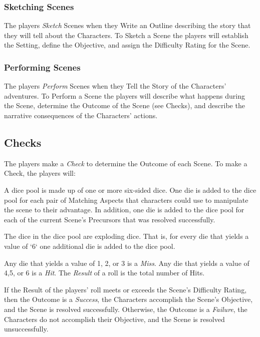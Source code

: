 \documentclass[12pt, a5paper, parskip=half-]{scrartcl}
\begin{document}
\newpage

\subsubsection*{Sketching Scenes}
The players \emph{Sketch} Scenes when they Write an Outline describing the story that they will tell about the Characters. To Sketch a Scene the players will establish the Setting, define the Objective, and assign the Difficulty Rating for the Scene.

\subsubsection*{Performing Scenes}
The players \emph{Perform} Scenes when they Tell the Story of the Characters' adventures.
To Perform a Scene the players will describe what happens during the Scene, determine the Outcome of the Scene (see Checks), and describe the narrative consequences of the Characters' actions.

\newpage

\subsection*{Checks}
The players make a \emph{Check} to determine the Outcome of each Scene. To make a Check, the players will:
\begin{description}[leftmargin=0pt]
\item[Assemble a Dice Pool]
     A dice pool is made up of one or more six-sided dice.
     One die is added to the dice pool for each pair of Matching Aspects that characters could use to manipulate the scene to their advantage.
     In addition, one die is added to the dice pool for each of the current Scene's Precursors that was resolved successfully.
 \item[Roll the Dice]
     The dice in the dice pool are exploding dice.
     That is, for every die that yields a value of `6` one additional die is added to the dice pool.
\item[Compute the Result]
     Any die that yields a value of 1, 2, or 3 is a \emph{Miss}.
     Any die that yields a value of 4,5, or 6 is a \emph{Hit}.
     The \emph{Result} of a roll is the total number of Hits.
\item[Determine the Outcome]
     If the Result of the players' roll meets or exceeds the Scene's Difficulty Rating, then the Outcome is a \emph{Success}, the Characters accomplish the Scene's Objective, and the Scene is resolved successfully.
     Otherwise, the Outcome is a \emph{Failure}, the Characters do not accomplish their Objective, and the Scene is resolved unsuccessfully.
 \end{description}
\end{document}

